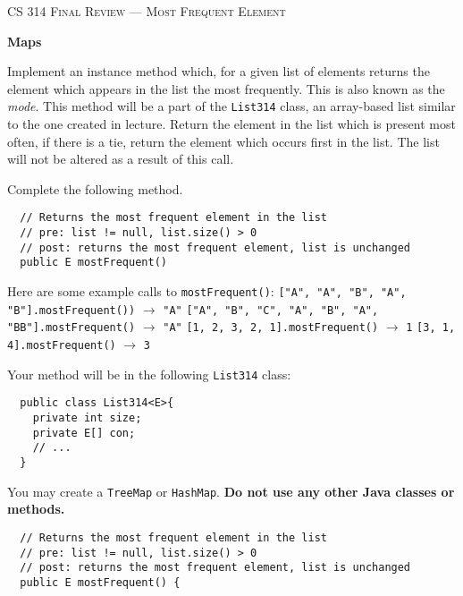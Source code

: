 \documentclass[12pt,letter]{article}
\begin{document}
\noindent\textsc{\large CS 314 Final Review --- Most Frequent Element}

\vspace{6pt}
\noindent\textbf{Maps}

\vspace{2pt}
\noindent Implement an instance method which, for a given list of elements returns the element which appears in the list the most frequently. 
This is also known as the \emph{mode}. This method will be a part of the \texttt{List314} class, 
an array-based list similar to the one created in lecture. Return the element in the list which is 
present most often, if there is a tie, return the element which occurs first in the list.
The list will not be altered as a result of this call.

\vspace{4pt}
\noindent Complete the following method.
\begin{verbatim}
  // Returns the most frequent element in the list
  // pre: list != null, list.size() > 0
  // post: returns the most frequent element, list is unchanged
  public E mostFrequent()
\end{verbatim}

\vspace{4pt}
\noindent Here are some example calls to \texttt{mostFrequent()}:
\newline
\noindent \texttt{["A", "A", "B", "A", "B"].mostFrequent())} $\rightarrow$ \texttt{"A"}
\newline
\noindent \texttt{["A", "B", "C", "A", "B", "A", "BB"].mostFrequent()} $\rightarrow$ \texttt{"A"}
\newline
\noindent \texttt{[1, 2, 3, 2, 1].mostFrequent()} $\rightarrow$ \texttt{1}
\newline
\noindent \texttt{[3, 1, 4].mostFrequent()} $\rightarrow$ \texttt{3}
\newline

\noindent Your method will be in the following \texttt{List314} class:

\begin{verbatim}
  public class List314<E>{
    private int size;
    private E[] con;
    // ...
  }

\end{verbatim}

\noindent You may create a \texttt{TreeMap} or \texttt{HashMap}. 
\newline
\noindent \textbf{Do not use any other Java classes or methods.}

\clearpage
\begin{verbatim}
  // Returns the most frequent element in the list
  // pre: list != null, list.size() > 0
  // post: returns the most frequent element, list is unchanged
  public E mostFrequent() {
\end{verbatim}
\end{document}
